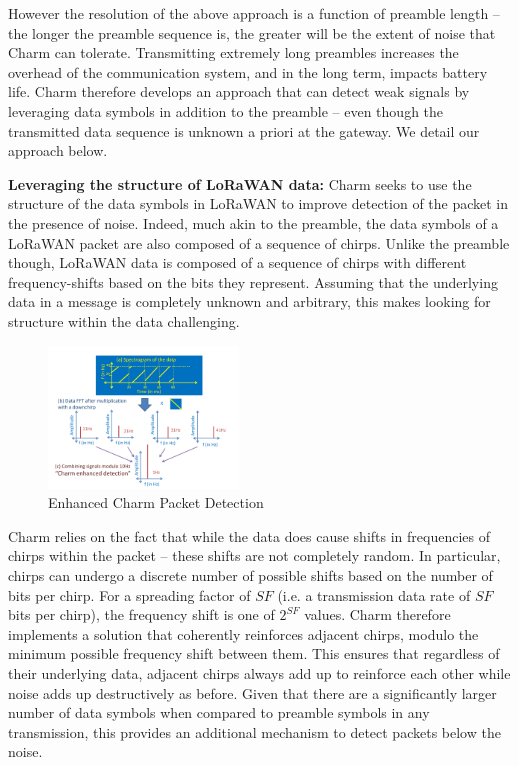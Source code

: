 However the resolution of the above approach is a function of preamble length
-- the longer the preamble sequence is, the greater will be the extent of
noise that Charm can tolerate. Transmitting extremely long preambles increases
the overhead of the communication system, and in the long term, impacts
battery life. Charm therefore develops an approach that can detect weak
signals by leveraging data symbols in addition to the preamble -- even though
the transmitted data sequence is unknown a priori at the gateway. We detail
our approach below.

\noindent \textbf{Leveraging the structure of LoRaWAN data: } Charm seeks to
use the structure of the data symbols in LoRaWAN to improve detection of the
packet in the presence of noise. Indeed, much akin to the preamble, the data
symbols of a LoRaWAN packet are also composed of a sequence of chirps. Unlike
the preamble though, LoRaWAN data is composed of a sequence of chirps with
different frequency-shifts based on the bits they represent. Assuming that the
underlying data in a message is completely unknown and arbitrary, this makes
looking for structure within the data challenging.


\begin{figure}
    \centering
    \includegraphics[width=0.45\textwidth]{figures/CharmEnhancedDetection.pdf}
        \vspace*{-0.1in}
    \caption{Enhanced Charm Packet Detection}
    \label{fig:enhanced_charm}
    \compactimg
\end{figure}

Charm relies on the fact that while the data does cause shifts in frequencies
of chirps within the packet -- these shifts are not completely random. In
particular, chirps can undergo a discrete number of possible shifts based on
the number of bits per chirp. For a spreading factor of $SF$ (i.e. a
transmission data rate of $SF$ bits per chirp), the frequency shift is one of
$2^{SF}$ values. Charm therefore implements a solution that coherently
reinforces adjacent chirps, modulo the minimum possible frequency shift
between them. This ensures that regardless of their underlying data, adjacent
chirps always add up to reinforce each other while noise adds up destructively
as before. Given that there are a significantly larger number of data symbols
when compared to preamble symbols in any transmission, this provides an
additional mechanism to detect packets below the noise.

